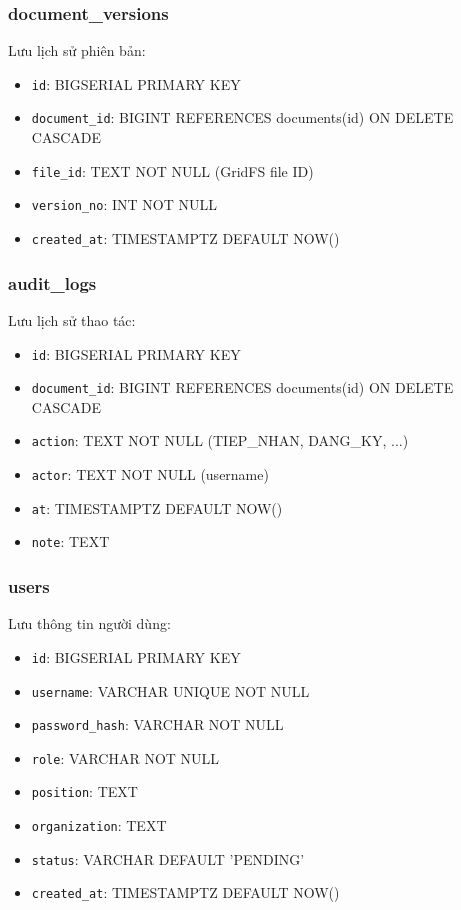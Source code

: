 \documentclass[12pt,a4paper]{article}
\begin{document}
\subsubsection{document\_versions}
Lưu lịch sử phiên bản:
\begin{itemize}
    \item \texttt{id}: BIGSERIAL PRIMARY KEY
    \item \texttt{document\_id}: BIGINT REFERENCES documents(id) ON DELETE CASCADE
    \item \texttt{file\_id}: TEXT NOT NULL (GridFS file ID)
    \item \texttt{version\_no}: INT NOT NULL
    \item \texttt{created\_at}: TIMESTAMPTZ DEFAULT NOW()
\end{itemize}

\subsubsection{audit\_logs}
Lưu lịch sử thao tác:
\begin{itemize}
    \item \texttt{id}: BIGSERIAL PRIMARY KEY
    \item \texttt{document\_id}: BIGINT REFERENCES documents(id) ON DELETE CASCADE
    \item \texttt{action}: TEXT NOT NULL (TIEP\_NHAN, DANG\_KY, ...)
    \item \texttt{actor}: TEXT NOT NULL (username)
    \item \texttt{at}: TIMESTAMPTZ DEFAULT NOW()
    \item \texttt{note}: TEXT
\end{itemize}

\subsubsection{users}
Lưu thông tin người dùng:
\begin{itemize}
    \item \texttt{id}: BIGSERIAL PRIMARY KEY
    \item \texttt{username}: VARCHAR UNIQUE NOT NULL
    \item \texttt{password\_hash}: VARCHAR NOT NULL
    \item \texttt{role}: VARCHAR NOT NULL
    \item \texttt{position}: TEXT
    \item \texttt{organization}: TEXT
    \item \texttt{status}: VARCHAR DEFAULT 'PENDING'
    \item \texttt{created\_at}: TIMESTAMPTZ DEFAULT NOW()
\end{itemize}
\end{document}
